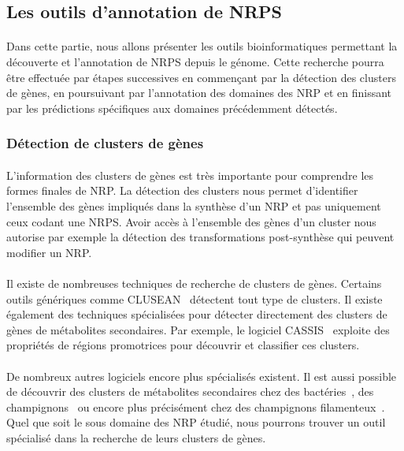 \documentclass[12pt,french,twoside]{report}
\begin{document}
\subsection{Les outils d'annotation de NRPS}

\paragraph{}Dans cette partie, nous allons présenter les outils bioinformatiques permettant la découverte et l'annotation de NRPS depuis le génome.
Cette recherche pourra être effectuée par étapes successives en commençant par la détection des clusters de gènes, en poursuivant par l'annotation des domaines des NRP et en finissant par les prédictions spécifiques aux domaines précédemment détectés.

\subsubsection{Détection de clusters de gènes}

\paragraph{}L'information des clusters de gènes est très importante pour comprendre les formes finales de NRP.
La détection des clusters nous permet d'identifier l'ensemble des gènes impliqués dans la synthèse d'un NRP et pas uniquement ceux codant une NRPS.
Avoir accès à l'ensemble des gènes d'un cluster nous autorise par exemple la détection des transformations post-synthèse qui peuvent modifier un NRP.

\paragraph{}Il existe de nombreuses techniques de recherche de clusters de gènes.
Certains outils génériques comme CLUSEAN~\cite{weber_clusean:_2009} détectent tout type de clusters.
Il existe également des techniques spécialisées pour détecter directement des clusters de gènes de métabolites secondaires.
Par exemple, le logiciel CASSIS~\cite{wolf_cassis_2016} exploite des propriétés de régions promotrices pour découvrir et classifier ces clusters.

\paragraph{}De nombreux autres logiciels encore plus spécialisés existent.
Il est aussi possible de découvrir des clusters de métabolites secondaires chez des bactéries~\cite{cruz-morales_recapitulation_2015}, des champignons~\cite{khaldi_smurf:_2010} ou encore plus précisément chez des champignons filamenteux~\cite{andersen_accurate_2013,umemura_motif-independent_2015}.
Quel que soit le sous domaine des NRP étudié, nous pourrons trouver un outil spécialisé dans la recherche de leurs clusters de gènes.
\end{document}
